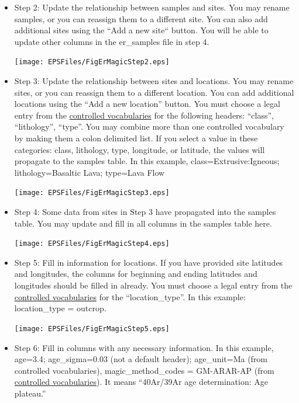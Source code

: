 \documentclass[11pt]{book}
\begin{document}
{\begin{itemize}
 \texttt{[image: EPSFiles/FigErMagicStep1.eps]}

\item Step 2:  Update the relationship between samples and sites.  You may rename samples, or you can reassign them to a different site.  You can also add additional sites using the ``Add a new site`` button.  You will be able to update other columns in the er\_samples file in step 4.

 \texttt{[image: EPSFiles/FigErMagicStep2.eps]}

\item Step 3: Update the relationship between sites and locations.  You may rename sites, or you can reassign them to a different location.  You can add additional locations using the ``Add a new location'' button.  You must choose a legal entry from the \href{http://earthref.org/MAGIC/shortlists.htm}{controlled vocabularies} for the following headers: ``class'', ``lithology'', ``type''. You may combine more than one controlled vocabulary by making them a colon delimited list.  If you select a value in these categories: class, lithology, type, longitude, or latitude, the values will propagate to the samples table.  In this example,  class=Extrusive:Igneous; lithology=Basaltic Lava; type=Lava Flow

\texttt{[image: EPSFiles/FigErMagicStep3.eps]}

\item Step 4: Some data from sites in Step 3 have propagated into the samples table.  You may update and fill in all columns in the samples table here.

\texttt{[image: EPSFiles/FigErMagicStep4.eps]}

\item Step 5: Fill in information for locations.  If you have provided site latitudes and longitudes, the columns for beginning and ending latitudes and longitudes should be filled in already. You must choose a legal entry from the \href{http://earthref.org/MAGIC/shortlists.htm}{controlled vocabularies} for the  ``location\_type''. In this example: location\_type = outcrop.

\texttt{[image: EPSFiles/FigErMagicStep5.eps]}

\item Step 6: Fill in columns with any necessary information.   In this example, age=3.4; age\_sigma=0.03 (not a default header); age\_unit=Ma (from controlled vocabularies), magic\_method\_codes  = GM-ARAR-AP (from \href{http://earthref.org/MAGIC/shortlists.htm}{controlled vocabularies}). It means ``40Ar/39Ar age determination: Age plateau.''


\end{itemize}}
\end{document}
